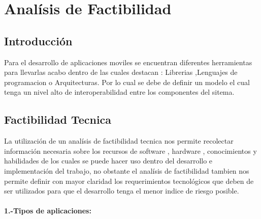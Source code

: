 \section{Analísis de Factibilidad}
\subsection{Introducción}
Para el desarrollo de aplicaciones moviles se encuentran diferentes herramientas para llevarlas acabo dentro de las cuales destacan :
Librerias ,Lenguajes de programacion o Arquitecturas.
Por lo cual se debe de definir un modelo el cual tenga un nivel alto de interoperabilidad entre los componentes del sitema.


\subsection{Factibilidad Tecnica}
La utilización de un analísis de factibilidad tecnica nos permite recolectar información necesaria sobre los recursos de software , hardware , conocimientos y habilidades de los cuales se puede hacer uso dentro del desarrollo e implementación del trabajo, no obstante el analísis de factibilidad tambien nos permite definir con mayor claridad los requerimientos tecnológicos que deben de ser utilizados para que el desarrollo tenga el menor indice de riesgo posible.


\paragraph{1.-Tipos de aplicaciones:}

